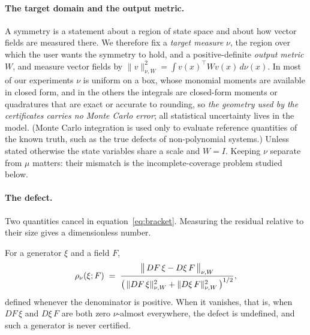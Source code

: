 \paragraph{The target domain and the output metric.} A symmetry is a statement
about a region of state space and about how vector fields are measured there.
We therefore fix a \emph{target measure} $\nu$, the region over which the user
wants the symmetry to hold, and a positive-definite \emph{output metric} $W$,
and measure vector fields by $\|v\|_{\nu,W}^2 = \int v(x)^{\!\top} W v(x)\,
d\nu(x)$. In most of our experiments $\nu$ is uniform on a box, whose monomial
moments are available in closed form, and in the others the integrals are
closed-form moments or quadratures that are exact or accurate to rounding, so
\emph{the geometry used by the certificates carries no Monte Carlo error}; all
statistical uncertainty lives in the model. (Monte Carlo integration is used
only to evaluate reference quantities of the known truth, such as the true
defects of non-polynomial systems.) Unless stated otherwise
the state variables share a scale and $W = I$. Keeping $\nu$ separate from
$\mu$ matters: their mismatch is the incomplete-coverage problem studied below.

\paragraph{The defect.} Two quantities cancel in equation~\eqref{eq:bracket}.
Measuring the residual relative to their size gives a dimensionless number.

\begin{definition}
\label{def:defect}
For a generator $\xi$ and a field $F$,
\begin{equation}
  \rho_\nu(\xi; F) \;=\;
  \frac{\bigl\| \,DF\,\xi - D\xi\,F\, \bigr\|_{\nu,W}}
       {\bigl(\,\|DF\,\xi\|_{\nu,W}^{2}
        + \|D\xi\,F\|_{\nu,W}^{2}\,\bigr)^{1/2}} ,
  \label{eq:defect}
\end{equation}
defined whenever the denominator is positive. When it vanishes, that is, when
$DF\,\xi$ and $D\xi\,F$ are both zero $\nu$-almost everywhere, the defect is
undefined, and such a generator is never certified.
\end{definition}

